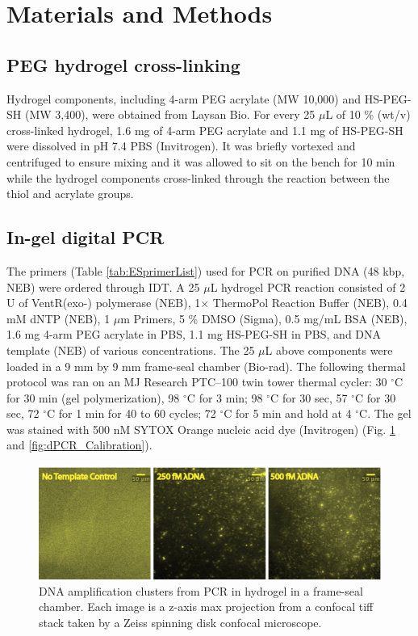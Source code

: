 \section{Materials and Methods}
\subsection{PEG hydrogel cross-linking}
Hydrogel components, including 4-arm PEG acrylate (MW 10,000) and HS-PEG-SH (MW 3,400), were obtained from Laysan Bio. For every 25 $\mu$L of 10 \% (wt\slash v) cross-linked hydrogel, 1.6 mg of 4-arm PEG acrylate and 1.1 mg of HS-PEG-SH were dissolved in pH 7.4 PBS (Invitrogen). It was briefly vortexed and centrifuged to ensure mixing and it was allowed to sit on the bench for 10 min while the hydrogel components cross-linked through the reaction between the thiol and acrylate groups.
\subsection{In-gel digital PCR}
The primers (Table \ref{tab:ESprimerList}) used for PCR on purified \textlambda DNA (48 kbp, NEB) were ordered through IDT. A 25 $\mu$L hydrogel PCR reaction consisted of 2 U of VentR(exo-) polymerase (NEB), 1$\times$ ThermoPol Reaction Buffer (NEB), 0.4 mM dNTP (NEB), 1 $\mu$m Primers, 5 \% DMSO (Sigma), 0.5 mg\slash mL BSA (NEB), 1.6 mg 4-arm PEG acrylate in PBS, 1.1 mg HS-PEG-SH in PBS, and \textlambda DNA template (NEB) of various concentrations. The 25 $\mu$L above components were loaded in a 9 mm by 9 mm frame-seal chamber (Bio-rad). The following thermal protocol was ran on an MJ Research PTC--100 twin tower thermal cycler: 30 $^{\circ}$C for 30 min (gel polymerization), 98 $^{\circ}$C for 3 min; 98 $^{\circ}$C for 30 sec, 57 $^{\circ}$C for 30 sec, 72 $^{\circ}$C for 1 min for 40 to 60 cycles; 72 $^{\circ}$C for 5 min and hold at 4 $^{\circ}$C. The gel was stained with 500 nM SYTOX Orange nucleic acid dye (Invitrogen) (Fig. \ref{fig:dPCR_FS} and \ref{fig:dPCR_Calibration}).

\begin{figure}
\centering
\includegraphics[keepaspectratio,width=1\textwidth]{./figures/dPCR_FrameSeal.png}
\caption[DNA amplification clusters from PCR in hydrogel in a frame-seal chamber.]{DNA amplification clusters from PCR in hydrogel in a frame-seal chamber. Each image is a z-axis max projection from a confocal tiff stack taken by a Zeiss spinning disk confocal microscope.}
\label{fig:dPCR_FS}
\end{figure}

